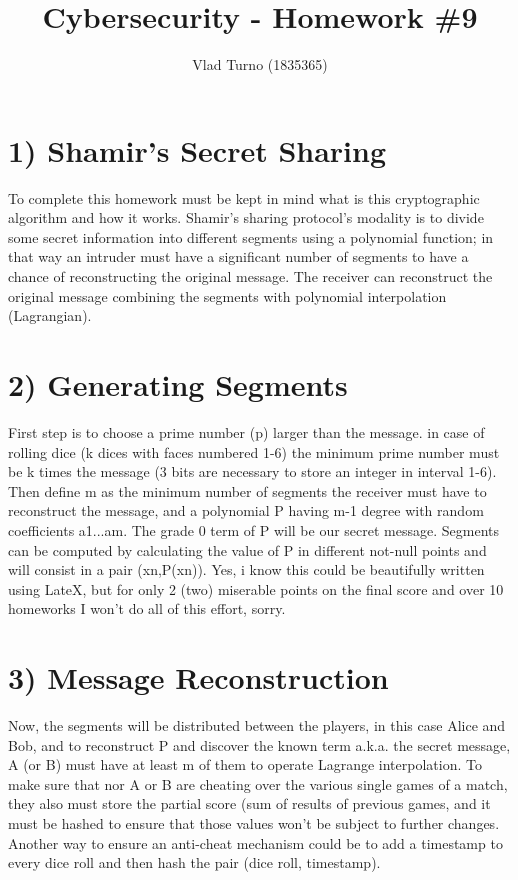 \documentclass{article}
\title{Cybersecurity - Homework \#9}
\author{Vlad Turno (1835365)}
\begin{document}
\maketitle

\section*{1) Shamir's Secret Sharing}
To complete this homework must be kept in mind what is this cryptographic algorithm and how it works. Shamir's sharing protocol's modality is to divide some secret information into different segments using a polynomial function; in that way an intruder must have a significant number of segments to have a chance of reconstructing the original message. The receiver can reconstruct the original message combining the segments with polynomial interpolation (Lagrangian).

\section*{2) Generating Segments}
First step is to choose a prime number (p) larger than the message. in case of rolling dice (k dices with faces numbered 1-6) the minimum prime number must be k times the message (3 bits are necessary to store an integer in interval 1-6).
Then define m as the minimum number of segments the receiver must have to reconstruct the message, and a polynomial P having m-1 degree with random coefficients a1...am.
The grade 0 term of P will be our secret message.
Segments can be computed by calculating the value of P in different not-null points and will consist in a pair (xn,P(xn)). Yes, i know this could be beautifully written using LateX, but for only 2 (two) miserable points on the final score and over 10 homeworks I won't do all of this effort, sorry.

\section*{3) Message Reconstruction}
Now, the segments will be distributed between the players, in this case Alice and Bob, and to reconstruct P and discover the known term a.k.a. the secret message, A (or B) must have at least m of them to operate Lagrange interpolation. To make sure that nor A or B are cheating over the various single games of a match, they also must store the partial score (sum of results of previous games, and it must be hashed to ensure that those values won't be subject to further changes.
Another way to ensure an anti-cheat mechanism could be to add a timestamp to every dice roll and then hash the pair (dice roll, timestamp).
\end{document}

